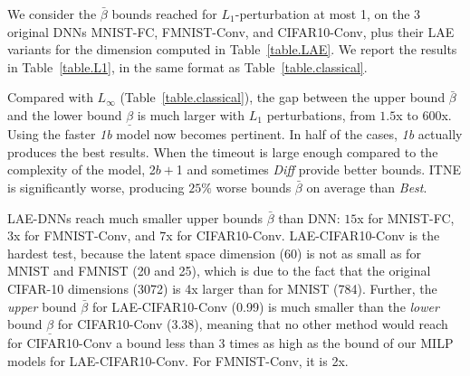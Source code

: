 We consider the $\bar{\beta}$ bounds reached for $L_1$-perturbation  at most 1, on the 3 original DNNs MNIST-FC, FMNIST-Conv, and CIFAR10-Conv, plus their LAE variants for the dimension computed in Table~\ref{table.LAE}.
We report the results in Table~\ref{table.L1}, in the same format as Table~\ref{table.classical}.







 Compared with $L_\infty$ (Table~\ref{table.classical}), the gap between the upper bound $\bar{\beta}$ and 
the lower bound $\underline{\beta}$ is much larger with 
$L_1$ perturbations, from $1.5$x to $600$x. Using 
the faster {\em 1b} model now becomes pertinent. In half of the cases, {\em 1b} actually produces the best results. When the timeout is large enough compared to the complexity of the model, 2$b+$1 and sometimes {\em Diff} provide better bounds. ITNE is significantly worse, producing $25\%$ worse bounds 
$\bar{\beta}$ on average than {\em Best}.

LAE-DNNs reach much smaller upper bounds $\bar{\beta}$ than DNN: $15$x for MNIST-FC, $3$x for FMNIST-Conv, and $7$x for CIFAR10-Conv. 
LAE-CIFAR10-Conv is the hardest test, because the latent space dimension (60) is not as small as for MNIST and FMNIST (20 and 25), which is due to the fact that the original CIFAR-10 dimensions (3072) is 4x larger than for MNIST (784).
Further, the {\em upper} bound $\bar{\beta}$ for LAE-CIFAR10-Conv (0.99) is much smaller than the {\em lower} bound $\underline{\beta}$ 
for CIFAR10-Conv (3.38), meaning that no other method 
would reach for CIFAR10-Conv a bound less than 3 times as high as the bound of our MILP models for LAE-CIFAR10-Conv. For FMNIST-Conv, it is 2x.



	



